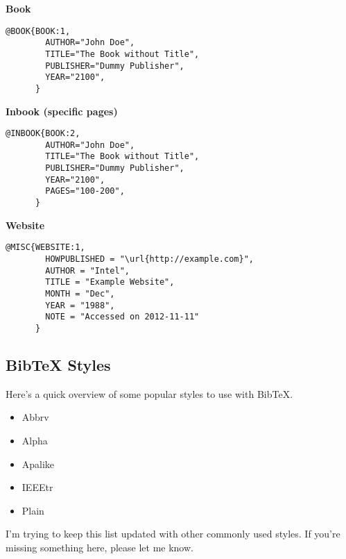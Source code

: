     \textbf{Book}
    \begin{lstlisting}[language={[LaTeX]TeX}, breaklines=true,frame=single]
      @BOOK{BOOK:1,
        AUTHOR="John Doe",
        TITLE="The Book without Title",
        PUBLISHER="Dummy Publisher",
        YEAR="2100",
      }
    \end{lstlisting}

    \textbf{Inbook (specific pages)}
    \begin{lstlisting}[language={[LaTeX]TeX}, breaklines=true,frame=single]
      @INBOOK{BOOK:2,
        AUTHOR="John Doe",
        TITLE="The Book without Title",
        PUBLISHER="Dummy Publisher",
        YEAR="2100",
        PAGES="100-200",
      }
    \end{lstlisting}


    \textbf{Website}
    \begin{lstlisting}[language={[LaTeX]TeX}, breaklines=true,frame=single]
      @MISC{WEBSITE:1,
        HOWPUBLISHED = "\url{http://example.com}",
        AUTHOR = "Intel",
        TITLE = "Example Website",
        MONTH = "Dec",
        YEAR = "1988",
        NOTE = "Accessed on 2012-11-11"
      }
    \end{lstlisting}

  \subsection{BibTeX Styles}
    Here's a quick overview of some popular styles to use with BibTeX.

    \begin{itemize} %
      \item Abbrv
      \item Alpha
      \item Apalike
      \item IEEEtr
      \item Plain
    \end{itemize} 
    I'm trying to keep this list updated with other commonly used styles. If you're missing something here, please let me know.



